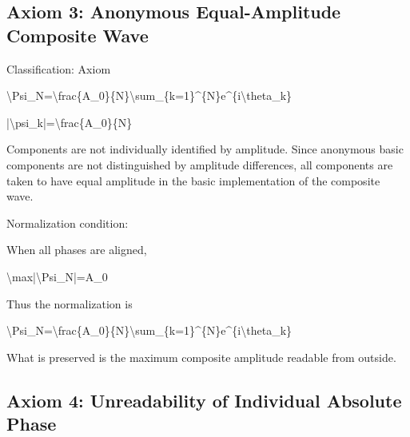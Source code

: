 \documentclass[
  a4paper]{article}
\newenvironment{Shaded}{}{}
\newcommand{\NormalTok}[1]{#1}
\begin{document}
\subsection{Axiom 3: Anonymous Equal-Amplitude Composite
Wave}\label{axiom-3-anonymous-equal-amplitude-composite-wave}

Classification: Axiom

\begin{Shaded}
\begin{Highlighting}[]
\NormalTok{\textbackslash{}Psi\_N=\textbackslash{}frac\{A\_0\}\{N\}\textbackslash{}sum\_\{k=1\}\^{}\{N\}e\^{}\{i\textbackslash{}theta\_k\}}
\end{Highlighting}
\end{Shaded}

\begin{Shaded}
\begin{Highlighting}[]
\NormalTok{|\textbackslash{}psi\_k|=\textbackslash{}frac\{A\_0\}\{N\}}
\end{Highlighting}
\end{Shaded}

Components are not individually identified by amplitude. Since anonymous
basic components are not distinguished by amplitude differences, all
components are taken to have equal amplitude in the basic implementation
of the composite wave.

Normalization condition:

When all phases are aligned,

\begin{Shaded}
\begin{Highlighting}[]
\NormalTok{\textbackslash{}max|\textbackslash{}Psi\_N|=A\_0}
\end{Highlighting}
\end{Shaded}

Thus the normalization is

\begin{Shaded}
\begin{Highlighting}[]
\NormalTok{\textbackslash{}Psi\_N=\textbackslash{}frac\{A\_0\}\{N\}\textbackslash{}sum\_\{k=1\}\^{}\{N\}e\^{}\{i\textbackslash{}theta\_k\}}
\end{Highlighting}
\end{Shaded}

What is preserved is the maximum composite amplitude readable from
outside.

\subsection{Axiom 4: Unreadability of Individual Absolute
Phase}\label{axiom-4-unreadability-of-individual-absolute-phase}
\end{document}
